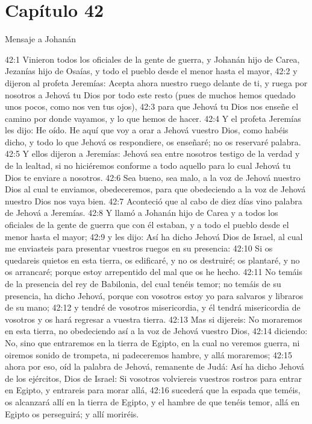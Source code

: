 \section*{Capítulo 42 }
Mensaje a Johanán 
 
42:1 Vinieron todos los oficiales de la gente de guerra, y Johanán hijo de Carea, Jezanías hijo de Osaías, y todo el pueblo desde el menor hasta el mayor, 
42:2 y dijeron al profeta Jeremías: Acepta ahora nuestro ruego delante de ti, y ruega por nosotros a Jehová tu Dios por todo este resto (pues de muchos hemos quedado unos pocos, como nos ven tus ojos), 
42:3 para que Jehová tu Dios nos enseñe el camino por donde vayamos, y lo que hemos de hacer. 
42:4 Y el profeta Jeremías les dijo: He oído. He aquí que voy a orar a Jehová vuestro Dios, como habéis dicho, y todo lo que Jehová os respondiere, os enseñaré; no os reservaré palabra. 
42:5 Y ellos dijeron a Jeremías: Jehová sea entre nosotros testigo de la verdad y de la lealtad, si no hiciéremos conforme a todo aquello para lo cual Jehová tu Dios te enviare a nosotros. 
42:6 Sea bueno, sea malo, a la voz de Jehová nuestro Dios al cual te enviamos, obedeceremos, para que obedeciendo a la voz de Jehová nuestro Dios nos vaya bien. 
42:7 Aconteció que al cabo de diez días vino palabra de Jehová a Jeremías. 
42:8 Y llamó a Johanán hijo de Carea y a todos los oficiales de la gente de guerra que con él estaban, y a todo el pueblo desde el menor hasta el mayor; 
42:9 y les dijo: Así ha dicho Jehová Dios de Israel, al cual me enviasteis para presentar vuestros ruegos en su presencia: 
42:10 Si os quedareis quietos en esta tierra, os edificaré, y no os destruiré; os plantaré, y no os arrancaré; porque estoy arrepentido del mal que os he hecho. 
42:11 No temáis de la presencia del rey de Babilonia, del cual tenéis temor; no temáis de su presencia, ha dicho Jehová, porque con vosotros estoy yo para salvaros y libraros de su mano; 
42:12 y tendré de vosotros misericordia, y él tendrá misericordia de vosotros y os hará regresar a vuestra tierra. 
42:13 Mas si dijereis: No moraremos en esta tierra, no obedeciendo así a la voz de Jehová vuestro Dios, 
42:14 diciendo: No, sino que entraremos en la tierra de Egipto, en la cual no veremos guerra, ni oiremos sonido de trompeta, ni padeceremos hambre, y allá moraremos; 
42:15 ahora por eso, oíd la palabra de Jehová, remanente de Judá: Así ha dicho Jehová de los ejércitos, Dios de Israel: Si vosotros volviereis vuestros rostros para entrar en Egipto, y entrareis para morar allá, 
42:16 sucederá que la espada que teméis, os alcanzará allí en la tierra de Egipto, y el hambre de que tenéis temor, allá en Egipto os perseguirá; y allí moriréis. 
